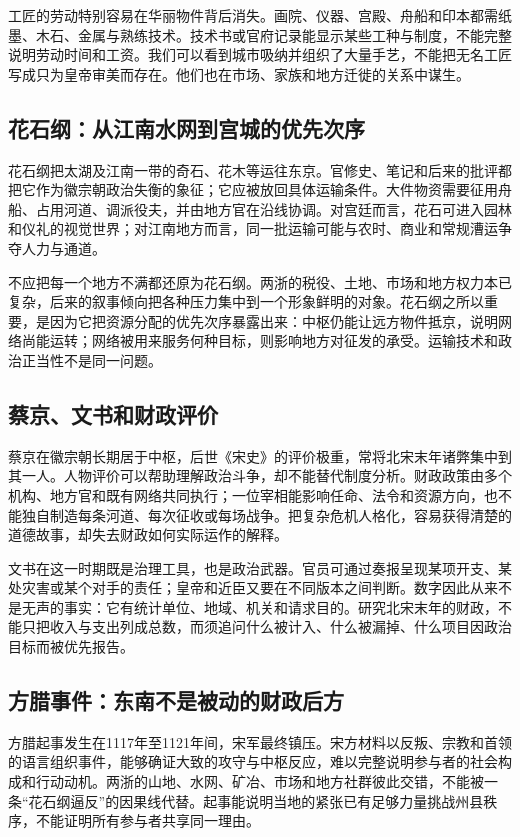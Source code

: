 工匠的劳动特别容易在华丽物件背后消失。画院、仪器、宫殿、舟船和印本都需纸墨、木石、金属与熟练技术。技术书或官府记录能显示某些工种与制度，不能完整说明劳动时间和工资。我们可以看到城市吸纳并组织了大量手艺，不能把无名工匠写成只为皇帝审美而存在。他们也在市场、家族和地方迁徙的关系中谋生。

\subsection{花石纲：从江南水网到宫城的优先次序}

花石纲把太湖及江南一带的奇石、花木等运往东京。官修史、笔记和后来的批评都把它作为徽宗朝政治失衡的象征；它应被放回具体运输条件。大件物资需要征用舟船、占用河道、调派役夫，并由地方官在沿线协调。对宫廷而言，花石可进入园林和仪礼的视觉世界；对江南地方而言，同一批运输可能与农时、商业和常规漕运争夺人力与通道。

不应把每一个地方不满都还原为花石纲。两浙的税役、土地、市场和地方权力本已复杂，后来的叙事倾向把各种压力集中到一个形象鲜明的对象。花石纲之所以重要，是因为它把资源分配的优先次序暴露出来：中枢仍能让远方物件抵京，说明网络尚能运转；网络被用来服务何种目标，则影响地方对征发的承受。运输技术和政治正当性不是同一问题。

\subsection{蔡京、文书和财政评价}

蔡京在徽宗朝长期居于中枢，后世《宋史》的评价极重，常将北宋末年诸弊集中到其一人。人物评价可以帮助理解政治斗争，却不能替代制度分析。财政政策由多个机构、地方官和既有网络共同执行；一位宰相能影响任命、法令和资源方向，也不能独自制造每条河道、每次征收或每场战争。把复杂危机人格化，容易获得清楚的道德故事，却失去财政如何实际运作的解释。

文书在这一时期既是治理工具，也是政治武器。官员可通过奏报呈现某项开支、某处灾害或某个对手的责任；皇帝和近臣又要在不同版本之间判断。数字因此从来不是无声的事实：它有统计单位、地域、机关和请求目的。研究北宋末年的财政，不能只把收入与支出列成总数，而须追问什么被计入、什么被漏掉、什么项目因政治目标而被优先报告。

\subsection{方腊事件：东南不是被动的财政后方}

方腊起事发生在1117年至1121年间，宋军最终镇压。宋方材料以反叛、宗教和首领的语言组织事件，能够确证大致的攻守与中枢反应，难以完整说明参与者的社会构成和行动动机。两浙的山地、水网、矿冶、市场和地方社群彼此交错，不能被一条“花石纲逼反”的因果线代替。起事能说明当地的紧张已有足够力量挑战州县秩序，不能证明所有参与者共享同一理由。

